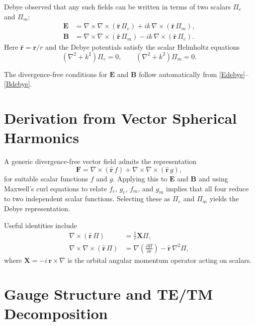 \documentclass[11pt]{article}
\begin{document}
Debye observed that any such fields can be written in terms of two
scalars $\Pi_e$ and $\Pi_m$:
\begin{align}
\mathbf{E}
 &= \nabla \times \nabla \times (\hat{\mathbf{r}}\, \Pi_e)
   + i k\, \nabla \times (\hat{\mathbf{r}}\, \Pi_m), \label{Edebye} \\
\mathbf{B}
 &= \nabla \times \nabla \times (\hat{\mathbf{r}}\, \Pi_m)
   - i k\, \nabla \times (\hat{\mathbf{r}}\, \Pi_e). \label{Bdebye}
\end{align}
Here $\hat{\mathbf{r}} = \mathbf{r}/r$ and the Debye potentials satisfy
the scalar Helmholtz equations
\begin{equation}
(\nabla^2 + k^2)\Pi_e = 0, \qquad
(\nabla^2 + k^2)\Pi_m = 0.
\end{equation}

The divergence-free conditions for $\mathbf{E}$ and $\mathbf{B}$ follow
automatically from \eqref{Edebye}--\eqref{Bdebye}.

\section{Derivation from Vector Spherical Harmonics}

A generic divergence-free vector field admits the representation
\begin{equation}
\mathbf{F}
 = \nabla \times (\hat{\mathbf{r}}\, f)
 + \nabla \times \nabla \times (\hat{\mathbf{r}}\, g),
\end{equation}
for suitable scalar functions $f$ and $g$. Applying this to
$\mathbf{E}$ and $\mathbf{B}$ and using Maxwell's curl equations to
relate $f_e$, $g_e$, $f_m$, and $g_m$ implies that all four reduce to
two independent scalar functions. Selecting these as $\Pi_e$ and
$\Pi_m$ yields the Debye representation.

Useful identities include
\begin{align}
\nabla \times (\hat{\mathbf{r}}\, \Pi)
 &= \frac{1}{r} \mathbf{X}\Pi, \\
\nabla \times \nabla \times (\hat{\mathbf{r}}\, \Pi)
 &= \nabla \left( \frac{\partial \Pi}{\partial r} \right)
   - \hat{\mathbf{r}}\, \nabla^2 \Pi,
\end{align}
where $\mathbf{X} = -i\, \mathbf{r} \times \nabla$ is the orbital
angular momentum operator acting on scalars.

\section{Gauge Structure and TE/TM Decomposition}
\end{document}

